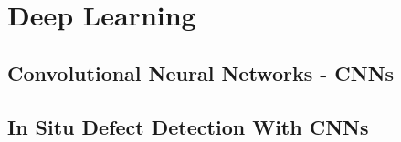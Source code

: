 \section{Deep Learning}
\label{sec:deep-learning}

\subsection{Convolutional Neural Networks - CNNs}
\label{subsec:convolutional-neural-networks---cnns}

\subsection{In Situ Defect Detection With CNNs}
\label{subsec:in-situ-defect-detection-with-cnns}
